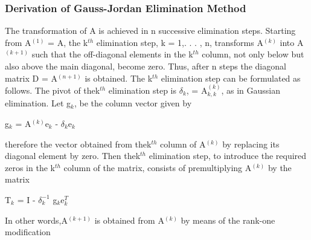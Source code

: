 \documentclass[12pt]{article}
\begin{document}
\subsubsection*{Derivation of  Gauss-Jordan Elimination Method}

The transformation of A is achieved in n successive elimination steps. Starting
from {A$^{(1)}$} = A, the {k$^{th}$} elimination step, k = 1,. . . , n,
transforms {A$^{(k)}$} into {A$^{(k+1)}$} such that the off-diagonal elements in
the {k$^{th}$} column, not only below but also above the main diagonal, become
zero. Thus, after n steps the diagonal matrix D = {A$^{(n+1)}$} is obtained. The
{k$^{th}$} elimination step can be formulated as follows. The pivot of
the{k$^{th}$} elimination step is $\delta_k$, = {A$^{(k)}_{k,k}$}, as in
Gaussian elimination. Let {g$_k$}, be the column vector given by

{g$_k$} = {A$^{(k)}$}{e$_k$} - $\delta_k${e$_k$}

therefore the vector obtained from the{k$^{th}$} column of {A$^{(k)}$} by
replacing its diagonal element by zero. Then the{k$^{th}$} elimination step, to
introduce the required zeros in the {k$^{th}$} column of the matrix, consists of
premultiplying {A$^{(k)}$} by the matrix

{T$_k$} = I - $\delta_k^{-1}$ {g$_k$}{e$_k^T$}

In other words,{A$^{(k+1)}$} is obtained from {A$^{(k)}$} by means of the
rank-one modification
\end{document}
